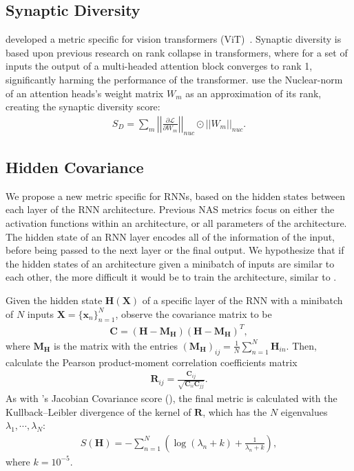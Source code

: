 \documentclass[11pt]{article}
\begin{document}
\subsection{Synaptic Diversity}
    \citet{zhou_training-free_2022} developed a metric specific for vision transformers (ViT)~\cite{dosovitskiy_image_2021}. Synaptic diversity is based upon previous research on rank collapse in transformers, where for a set of inputs the output of a multi-headed attention block converges to rank 1, significantly harming the performance of the transformer. \citeauthor{zhou_training-free_2022} use the Nuclear-norm of an attention heads's weight matrix $W_m$ as an approximation of its rank, creating the synaptic diversity score:
    \begin{align*}
        S_D = \sum_m\left|\left|\frac{\partial\mathcal{L}}{\partial W_m}\right|\right|_{nuc}\odot||W_m||_{nuc}.
    \end{align*}

\subsection{Hidden Covariance}
    We propose a new metric specific for RNNs, based on the hidden states between each layer of the RNN architecture. Previous NAS metrics focus on either the activation functions within an architecture, or all parameters of the architecture. The hidden state of an RNN layer encodes all of the information of the input, before being passed to the next layer or the final output. We hypothesize that if the hidden states of an architecture given a minibatch of inputs are similar to each other, the more difficult it would be to train the architecture, similar to \citet{mellor_neural_2021}.

    Given the hidden state $\mathbf{H}(\mathbf{X})$ of a specific layer of the RNN with a minibatch of $N$ inputs $\mathbf{X} = \{\mathbf{x}_n\}_{n=1}^N$, observe the covariance matrix to be 
    \begin{align*}
        \mathbf{C} = (\mathbf{H}-\mathbf{M}_\mathbf{H})(\mathbf{H}-\mathbf{M}_\mathbf{H})^T,
    \end{align*} where $\mathbf{M}_\mathbf{H}$ is the matrix with the entries $(\mathbf{M}_\mathbf{H})_{ij} = \frac{1}{N}\sum_{n=1}^N\mathbf{H}_{in}$. Then, calculate the Pearson product-moment correlation coefficients matrix
    \begin{align*}
        \mathbf{R}_{ij} = \frac{\mathbf{C}_{ij}}{\sqrt{\mathbf{C}_{ii}\mathbf{C}_{jj}}}.
    \end{align*}
    As with \citeauthor{mellor_neural_2021-1}'s Jacobian Covariance score (\citeyear{mellor_neural_2021-1}), the final metric is calculated with the Kullback–Leibler divergence of the kernel of $\mathbf{R}$, which has the $N$ eigenvalues $\lambda_1, \cdots, \lambda_N$:
    \begin{align*}
        S(\mathbf{H}) = -\sum_{n=1}^N\left(\log(\lambda_n + k) + \frac{1}{\lambda_n + k}\right),
    \end{align*}
    where $k = 10^{-5}$.
\end{document}
